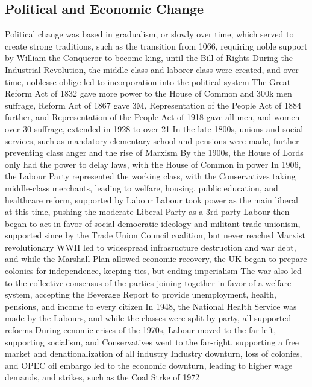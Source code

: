 \documentclass[11 pt, twoside]{article}
\newenvironment{outline*}
{
	\begin{outline}[enumerate]
	}
	{\end{outline}
}
\begin{document}
\subsection{Political and Economic Change}
\begin{outline*}
\1 Political change was based in gradualism, or slowly over time, which served to create strong traditions, such as the transition from 1066, requiring noble support by William the Conqueror to become king, until the Bill of Rights
\1 During the Industrial Revolution, the middle class and laborer class were created, and over time, noblesse oblige led to incorporation into the political system
\2 The Great Reform Act of 1832 gave more power to the House of Common and 300k men suffrage, Reform Act of 1867 gave 3M, Representation of the People Act of 1884 further, and Representation of the People Act of 1918 gave all men, and women over 30 suffrage, extended in 1928 to over 21
\2 In the late 1800s, unions and social services, such as mandatory elementary school and pensions were made, further preventing class anger and the rise of Marxism
\2 By the 1900s, the House of Lords only had the power to delay laws, with the House of Common in power
\1 In 1906, the Labour Party represented the working class, with the Conservatives taking middle-class merchants, leading to welfare, housing, public education, and healthcare reform, supported by Labour
\2 Labour took power as the main liberal at this time, pushing the moderate Liberal Party as a 3rd party
\2 Labour then began to act in favor of social democratic ideology and militant trade unionism, supported since by the Trade Union Council coalition, but never reached Marxist revolutionary
\1 WWII led to widespread infrasructure destruction and war debt, and while the Marshall Plan allowed economic recovery, the UK began to prepare colonies for independence, keeping ties, but ending imperialism
\1 The war also led to the collective consensus of the parties joining together in favor of a welfare system, accepting the Beverage Report to provide unemployment, health, pensions, and income to every citizen
\2 In 1948, the National Health Service was made by the Labours, and while the classes were split by party, all supported reforms
\2 During ecnomic crises of the 1970s, Labour moved to the far-left, supporting socialism, and Conservatives went to the far-right, supporting a free market and denationalization of all industry
\3 Industry downturn, loss of colonies, and OPEC oil embargo led to the economic downturn, leading to higher wage demands, and strikes, such as the Coal Strke of 1972

\end{outline*}
\end{document}

